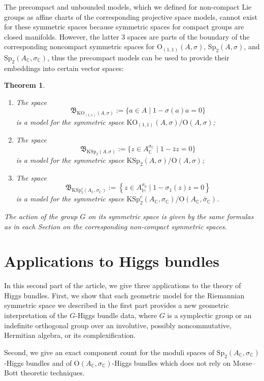 \documentclass[oneside,11pt]{amsart}
\newtheorem{thm}{Theorem}[section]
\theoremstyle{definition}
\theoremstyle{remark}
\numberwithin{thm}{section}
\numberwithin{equation}{section}
\begin{document}
The precompact and unbounded models, which we defined for non-compact Lie groups as affine charts of the corresponding projective space models, cannot exist for these symmetric spaces because symmetric spaces for compact groups are closed manifolds. However, the latter 3 spaces are parts of the boundary of the corresponding noncompact symmetric spaces for $\mathrm{O}_{(1,1)}(A,\sigma)$, $\mathrm{Sp}_{2}(A,\sigma)$, and $\mathrm{Sp}_{2}(A_\mathbb C,\sigma_\mathbb C)$, thus the precompact models can be used to provide their embeddings into certain vector spaces:

\begin{thm}$ $
    \begin{enumerate}
        \item The space 
        $$\mathfrak{B}_{\mathrm{KO}_{(1,1)}(A,\sigma)}:=\{a\in A\mid 1-\sigma(a)a=0\}$$ is a model for the symmetric space $\mathrm{KO}_{(1,1)}(A,\sigma)/\mathrm{O}(A,\sigma)$;
        \item The space 
        $$\mathfrak{B}_{\mathrm{KSp}_2(A,\sigma)}:=\{z\in A^{\sigma_\mathbb C}_\mathbb C\mid 1-\bar zz=0\}$$ is a model for the symmetric space $\mathrm{KSp}_2(A,\sigma)/\mathrm{O}(A,\sigma)$;
        \item The space 
        $$\mathfrak{B}_{\mathrm{KSp}^c_2(A_\mathbb C,\sigma_\mathbb C)}:=\left\{z\in A^{\sigma_0}_\mathbb{H}\mid 1-\sigma_1(z)z=0\right\}$$ is a model for the symmetric space $\mathrm{KSp}^c_2(A_\mathbb C,\sigma_\mathbb C)/\mathrm{O}(A_\mathbb C,\bar\sigma_\mathbb C)$.
    \end{enumerate}
\noindent The action of the group $G$ on its symmetric space is given by the same formulas as in each Section on the corresponding non-compact symmetric spaces.
\end{thm}

\newpage 

\part{Applications to Higgs bundles}
In this second part of the article, we give three applications to the theory of Higgs bundles.  First, we show that each geometric model for the Riemannian symmetric space we described in the first part provides a new geometric interpretation of the $G$-Higgs bundle data, where $G$ is a symplectic group or an indefinite orthogonal group over an involutive,
possibly noncommutative, Hermitian algebra, or its complexification. 

Second, we give an exact component count for the moduli spaces of $\mathrm{Sp}_2(A_{\mathbb{C}}, \sigma_{\mathbb{C}})$-Higgs bundles and of $\mathrm{O}(A_{\mathbb{C}}, \sigma_{\mathbb{C}})$-Higgs bundles which does not rely on  Morse--Bott theoretic techniques. 
\end{document}
